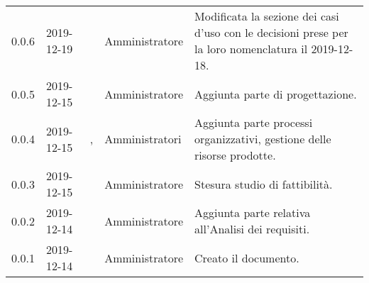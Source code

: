{\begin{longtable}{C{2cm} C{2cm}  C{3cm}  C{3cm} C{4.5cm}}
0.0.6 & 2019-12-19 & \CE{} & Amministratore & Modificata la sezione dei casi d’uso con le decisioni prese per la loro nomenclatura il 2019-12-18. \\

0.0.5 & 2019-12-15 & \SE{} & Amministratore & Aggiunta parte di progettazione. \\

0.0.4 & 2019-12-15 & \BR{}, \PF{}  & Amministratori & Aggiunta parte processi organizzativi, gestione delle risorse prodotte. \\

0.0.3 & 2019-12-15 & \MC{} & Amministratore & Stesura studio di fattibilità. \\

0.0.2 & 2019-12-14 & \CE{} & Amministratore & Aggiunta parte relativa all’Analisi dei requisiti. \\

0.0.1 & 2019-12-14 & \CE{} & Amministratore & Creato il documento. \\
		
\end{longtable}
}